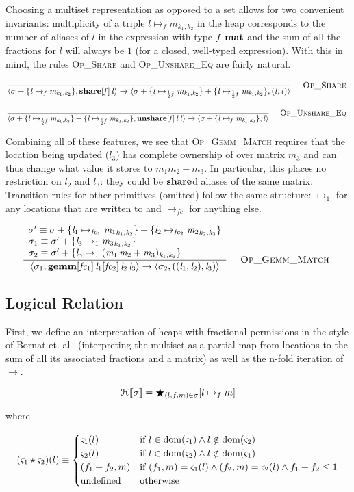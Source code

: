Choosing a multiset representation as opposed to a set allows for two
convenient invariants: multiplicity of a triple $l \mapsto_f m_{k_1, k_2}$ in
the heap corresponds to the number of aliases of $l$ in the expression with
type $f\ \ottkw{mat}$ and the sum of all the fractions for $l$ will always be
$1$ (for a closed, well-typed expression). With this in mind, the rules
\textsc{Op\_Share} and \textsc{Op\_Unshare\_Eq} are fairly natural.

\vspace{-\baselineskip}
\[
    \ottdruleOpXXShare{} \\
\]

\vspace{-\baselineskip}
\[
    \ottdruleOpXXUnshareXXEq{}
\]

Combining all of these features, we see that \textsc{Op\_Gemm\_Match} requires
that the location being updated ($l_3$) has complete ownership of over matrix
$m_3$ and can thus change what value it stores to $m_1 m_2 + m_3$. In
particular, this places no restriction on $l_2$ and $l_3$: they could be
$\ottkw{share}$d aliases of the same matrix. Transition rules for other
primitives (omitted) follow the same structure: $\mapsto_1$ for any locations
that are written to and $\mapsto_{f\!c}$ for anything else.

\vspace{-\baselineskip}
\[
    \ottdruleOpXXGemmXXMatch{}
\]

\subsection{Logical Relation}

First, we define an interpretation of heaps with fractional permissions in the
style of Bornat et. al~\cite{bornat} (interpreting the multiset as a partial
map from locations to the sum of all its associated fractions and a matrix) as
well as the n-fold iteration of $\rightarrow$.

\vspace{-\baselineskip}
\[
    \den{H}{}{\sigma} = \bigstar_{(l,f,m) \in \sigma} [ l \mapsto_f m ]
\]

where

\vspace{-\baselineskip}
\[
    (\varsigma_1 \star \varsigma_2)(l) \equiv
    \begin{cases}
        \varsigma_1(l) & \textrm{if } l \in \dom(\varsigma_1) \wedge l \notin \dom(\varsigma_2) \\
        \varsigma_2(l) & \textrm{if } l \in \dom(\varsigma_2) \wedge l \notin \dom(\varsigma_1) \\
        (f_1 + f_2, m) & \textrm{if } (f_1, m) = \varsigma_1(l) \wedge (f_2, m) = \varsigma_2(l) \wedge f_1 + f_2 \leq 1 \\
        \textrm{undefined} & \textrm{otherwise}
    \end{cases}
\]

